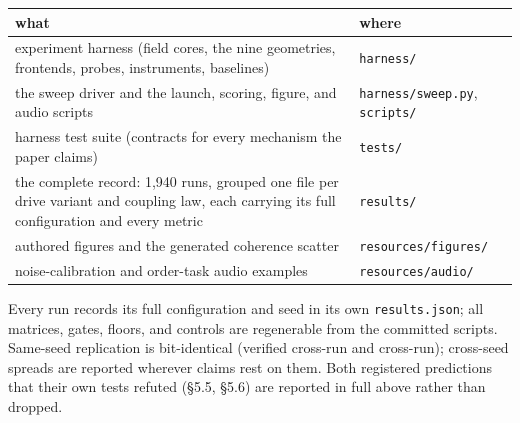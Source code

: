\documentclass[10pt]{article}
\newcounter{none} %
\begin{document}
{\def\LTcaptype{none} %
\begin{longtable}[]{@{}
  >{\raggedright\arraybackslash}p{}
  >{\raggedright\arraybackslash}p{}@{}}
\toprule\noalign{}
\begin{minipage}[b]{\linewidth}\raggedright
what
\end{minipage} & \begin{minipage}[b]{\linewidth}\raggedright
where
\end{minipage} \\
\midrule\noalign{}
\endhead
\bottomrule\noalign{}
\endlastfoot
experiment harness (field cores, the nine geometries, frontends, probes,
instruments, baselines) & \texttt{harness/} \\
\cmidrule{1-2}the sweep driver and the launch, scoring, figure, and
audio scripts & \texttt{harness/sweep.py}, \texttt{scripts/} \\
\cmidrule{1-2}harness test suite (contracts for every mechanism the
paper claims) & \texttt{tests/} \\
\cmidrule{1-2}the complete record: 1,940 runs, grouped one file per
drive variant and coupling law, each carrying its full configuration and
every metric & \texttt{results/} \\
\cmidrule{1-2}authored figures and the generated coherence scatter &
\texttt{resources/figures/} \\
\cmidrule{1-2}noise-calibration and order-task audio examples &
\texttt{resources/audio/} \\
\end{longtable}
}

Every run records its full configuration and seed in its own
\texttt{results.json}; all matrices, gates, floors, and controls are
regenerable from the committed scripts. Same-seed replication is
bit-identical (verified cross-run and cross-run); cross-seed spreads are
reported wherever claims rest on them. Both registered predictions that
their own tests refuted (§5.5, §5.6) are reported in full above rather
than dropped.


\end{document}
